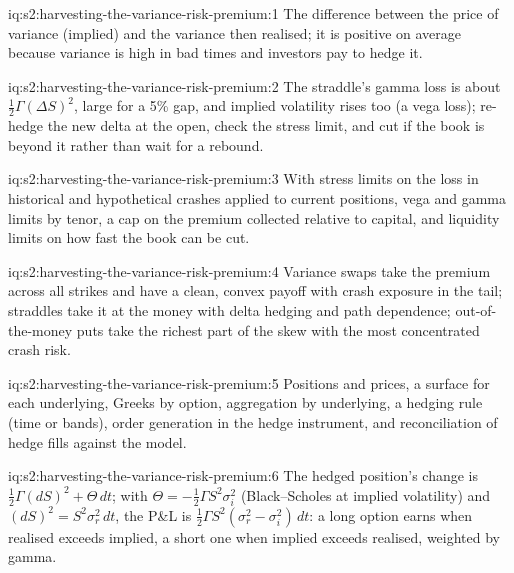 \begin{solution}{iq:s2:harvesting-the-variance-risk-premium:1}
The difference between the price of variance (implied) and the variance then realised; it is positive on average because variance is high in bad times
and investors pay to hedge it.
\end{solution}

\begin{solution}{iq:s2:harvesting-the-variance-risk-premium:2}
The straddle's gamma loss is about $\tfrac12\Gamma(\Delta S)^2$, large for a 5\% gap, and implied volatility rises too (a vega loss); re-hedge the new
delta at the open, check the stress limit, and cut if the book is beyond it rather than wait for a rebound.
\end{solution}

\begin{solution}{iq:s2:harvesting-the-variance-risk-premium:3}
With stress limits on the loss in historical and hypothetical crashes applied to current positions, vega and gamma limits by tenor, a cap on the
premium collected relative to capital, and liquidity limits on how fast the book can be cut.
\end{solution}

\begin{solution}{iq:s2:harvesting-the-variance-risk-premium:4}
Variance swaps take the premium across all strikes and have a clean, convex payoff with crash exposure in the tail; straddles take it at the money
with delta hedging and path dependence; out-of-the-money puts take the richest part of the skew with the most concentrated crash risk.
\end{solution}

\begin{solution}{iq:s2:harvesting-the-variance-risk-premium:5}
Positions and prices, a surface for each underlying, Greeks by option, aggregation by underlying, a hedging rule (time or bands), order generation in
the hedge instrument, and reconciliation of hedge fills against the model.
\end{solution}

\begin{solution}{iq:s2:harvesting-the-variance-risk-premium:6}
The hedged position's change is $\tfrac12\Gamma(dS)^2 + \Theta\,dt$; with $\Theta = -\tfrac12\Gamma S^2\sigma_i^2$ (Black--Scholes at implied volatility) and
$(dS)^2 = S^2\sigma_r^2\,dt$, the P\&L is $\tfrac12\Gamma S^2(\sigma_r^2 - \sigma_i^2)\,dt$: a long option earns when realised exceeds implied, a short one
when implied exceeds realised, weighted by gamma.
\end{solution}

